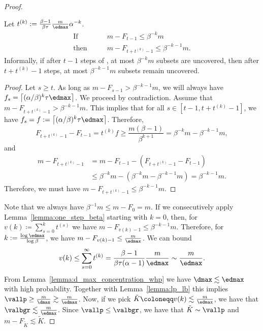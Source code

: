 \begin{proof}
\begin{lemma} \label{lemma:one_step_beta}
    Let \(t^{(k)} := \frac{\beta - 1}{\beta\tau} \frac{m}{\edmax} \alpha^{-k}\). 
    \begin{equation*}
        \begin{aligned}
            \text{If} \qquad &m - F_{t-1} \leq \beta^{-k} m  \\
            \text{then} \qquad &m - F_{t+t^{(k)}-1} \leq \beta^{-k-1} m.
        \end{aligned}
    \end{equation*}
    Informally, if after \(t - 1\) steps of \bgreedy, at most \(\beta^{-k} m\) subsets are uncovered, then after \(t + t^{(k)} - 1\) steps, at most \(\beta^{-k-1}m\) subsets remain uncovered.
\end{lemma}
\begin{proof}
    Let \(s \geq t\). As long as \(m - F_{s - 1} > \beta^{-k-1}m\), we will always have \(f_s = \bigl\lceil (\alpha / \beta)^{k} \tau \edmax\bigr\rceil\). We proceed by contradiction. Assume that \(m - F_{t + t^{(k)} - 1} > \beta^{-k-1}m\). This implies that for all \(s \in [t - 1, t + t^{(k)} - 1]\), we have \(f_s = f := \bigl\lceil (\alpha / \beta)^{k} \tau \edmax\bigr\rceil\). Therefore, 
    \begin{equation*}
    F_{t + t^{(k)} - 1} - F_{t - 1} = t^{(k)} f \geq \frac{m(\beta - 1)}{\beta^{k+1}} = \beta^{-k}m - \beta^{-k-1}m,
    \end{equation*}
    and 
    \begin{equation*}
    \begin{aligned}
    m - F_{t + t^{(k)} - 1} &= m - F_{t - 1} - \left(F_{t + t^{(k)} - 1} - F_{t - 1}\right) \\
    & \leq \beta^{-k}m - (\beta^{-k}m - \beta^{-k-1}m) = \beta^{-k-1}m.
    \end{aligned}
    \end{equation*}
    Therefore, we must have \(m - F_{t + t^{(k)} - 1} \leq \beta^{-k-1}m\).
\end{proof}
\noindent
Note that we always have \(\beta^{-1}m \leq m - F_0 = m\).
If we consecutively apply Lemma~\ref{lemma:one_step_beta} starting with \(k = 0\), then, for \(v(k) \coloneqq \sum_{s=0}^k t^{(s)}\) we have \(m - F_{v(k) - 1} \leq \beta^{-k-1} m\). Therefore, for \(k := \frac{\log \edmax}{\log {\beta}}\), we have \(m - F_{v(k) - 1} \leq \frac{m}{\edmax}\). We can bound
\begin{equation*}
v(k) \leq \sum_{s = 0}^{\infty} t^{(k)} = \frac{\beta - 1}{\beta \tau (\alpha - 1)} \frac{m}{\edmax} \sim \frac m \edmax.
\end{equation*}
From Lemma~\ref{lemma:d_max_concentration_whp} we have \(\dmax \lesssim \edmax\) with high probability. Together with Lemma~\ref{lemma:lp_lb} this implies \(\vallp \geq \frac{m}{\dmax} \gtrsim \frac m \edmax\).
Now, if we pick \(\tilde K \coloneqq v(k) \lesssim \frac m \edmax \), we have that \(\valbgr \lesssim \frac m \edmax\). Since \(\vallp \leq \valbgr\), we have that \(\tilde K \sim \vallp\) and \(m - F_{\tilde K} \lesssim \tilde K\). 


\end{proof}
